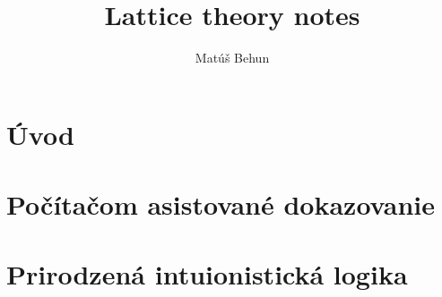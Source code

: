 \documentclass[a4paper,10pt,oneside]{report}%
\author{Mat\'u\v{s} Behun}
\title{Lattice theory notes}
\begin{document}
\tableofcontents

\section{Úvod}





\section{Počítačom asistované dokazovanie}

\section{Prirodzená intuionistická logika}
\end{document}
